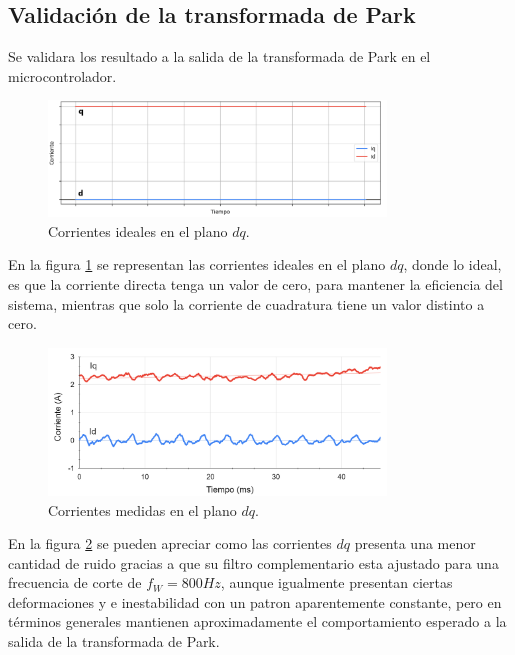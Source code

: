 \documentclass[11pt]{report}
\begin{document}
\newpage
\subsection{Validación de la transformada de Park}

Se validara los resultado a la salida de la transformada de Park en el microcontrolador.

\begin{figure}[ht]
	\centering
	\includegraphics[width=0.8\textwidth]{imagenes/graficas/Corrientes_dq_ideal.png}
	\caption{Corrientes ideales en el plano $dq$.}
	\label{corrientes_dq_ideal}
\end{figure}
\FloatBarrier

En la figura \ref{corrientes_dq_ideal} se representan las corrientes ideales en el plano $dq$, donde lo ideal, es que la corriente directa tenga un valor de cero, para mantener la eficiencia del sistema, mientras que solo la corriente de cuadratura tiene un valor distinto a cero.

\begin{figure}[ht]
	\centering
	\includegraphics[width=0.8\textwidth]{imagenes/graficas/Corrientes_dq.png}
	\caption{Corrientes medidas en el plano $dq$.}
	\label{corrientes_dq}
\end{figure}
\FloatBarrier

En la figura \ref{corrientes_dq} se pueden apreciar como las corrientes $dq$ presenta una menor cantidad de ruido gracias a que su filtro complementario esta ajustado para una frecuencia de corte de $f_W=800Hz$, aunque igualmente presentan ciertas deformaciones y e inestabilidad con un patron aparentemente constante, pero en términos generales mantienen aproximadamente el comportamiento esperado a la salida de la transformada de Park.
\end{document}
